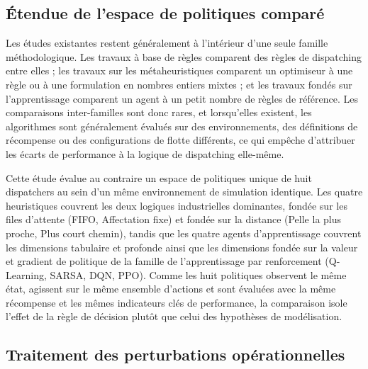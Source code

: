 \documentclass[11pt,a4paper]{article}
\begin{document}
\subsection{Étendue de l'espace de politiques comparé}

Les études existantes restent généralement à l'intérieur d'une seule famille méthodologique. Les travaux à base de règles \cite{Alarie2002, Subtil2011, MehrnazMohtasham2023, NecmettinCetin2004} comparent des règles de dispatching entre elles ; les travaux sur les métaheuristiques \cite{Souza2010, GuangweiLiu2019, ShivPrakashUpadhyay2017, BurakOzdemir2019} comparent un optimiseur à une règle ou à une formulation en nombres entiers mixtes ; et les travaux fondés sur l'apprentissage \cite{deCarvalho2023, Zhao2025, Pei2025, FranciscoRosales2025} comparent un agent à un petit nombre de règles de référence. Les comparaisons inter-familles sont donc rares, et lorsqu'elles existent, les algorithmes sont généralement évalués sur des environnements, des définitions de récompense ou des configurations de flotte différents, ce qui empêche d'attribuer les écarts de performance à la logique de dispatching elle-même.

Cette étude évalue au contraire un espace de politiques unique de huit dispatchers au sein d'un même environnement de simulation identique. Les quatre heuristiques couvrent les deux logiques industrielles dominantes, fondée sur les files d'attente (FIFO, Affectation fixe) et fondée sur la distance (Pelle la plus proche, Plus court chemin), tandis que les quatre agents d'apprentissage couvrent les dimensions tabulaire et profonde ainsi que les dimensions fondée sur la valeur et gradient de politique de la famille de l'apprentissage par renforcement (Q-Learning, SARSA, DQN, PPO). Comme les huit politiques observent le même état, agissent sur le même ensemble d'actions et sont évaluées avec la même récompense et les mêmes indicateurs clés de performance, la comparaison isole l'effet de la règle de décision plutôt que celui des hypothèses de modélisation.

\subsection{Traitement des perturbations opérationnelles}
\end{document}
